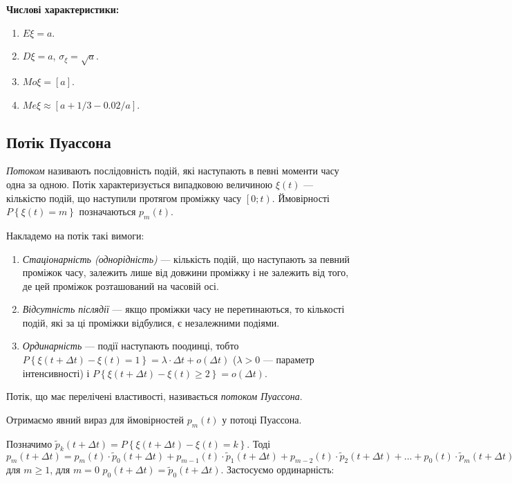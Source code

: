 \noindent\textbf{Числові характеристики:}
\begin{enumerate}
    \item $E\xi = a$.
    \item $D\xi = a$, $\sigma_\xi = \sqrt{a}$.
    \item ${Mo}\xi = \left[a\right]$.
    \item ${Me}\xi \approx \left[a + 1/3 - 0.02/a\right]$.
\end{enumerate}

\subsection{Потік Пуассона}
\emph{Потоком} називають послідовність подій, які наступають в певні моменти часу одна за одною.
Потік характеризується випадковою величиною $\xi(t)$ --- 
кількістю подій, що наступили протягом проміжку часу $\left[ 0; t\right)$.
Ймовірності $P\left\{\xi(t) = m\right\}$ позначаються $p_m(t)$.

Накладемо на потік такі вимоги:
\begin{enumerate}
    \item \emph{Стаціонарність (однорідність)} --- кількість подій, що наступають
    за певний проміжок часу, залежить лише від довжини проміжку і не залежить
    від того, де цей проміжок розташований на часовій осі.
    \item \emph{Відсутність післядії} --- якщо проміжки часу не перетинаються, то кількості подій,
    які за ці проміжки відбулися, є незалежними подіями.
    \item \emph{Ординарність} --- події наступають поодинці, тобто
    $P\left\{\xi(t+\Delta t) - \xi(t) = 1\right\} = \lambda\cdot\Delta t + o(\Delta t)$
    ($\lambda > 0$ --- параметр інтенсивності) і 
    $P\left\{\xi(t+\Delta t) - \xi(t) \geq 2\right\} = o(\Delta t)$.
\end{enumerate}
\begin{definition}
    Потік, що має перелічені властивості, називається \emph{потоком Пуассона}.
\end{definition}
Отримаємо явний вираз для ймовірностей $p_m(t)$ у потоці Пуассона.

Позначимо $\tilde{p}_k(t+\Delta t) = P\left\{\xi(t+\Delta t) - \xi(t) = k\right\}$.
Тоді $p_m(t+\Delta t) = p_m(t)\cdot \tilde{p}_0(t+\Delta t) + p_{m-1}(t)\cdot \tilde{p}_1(t+\Delta t) +
p_{m-2}(t)\cdot \tilde{p}_2(t+\Delta t) + ... + p_0(t)\cdot \tilde{p}_m(t+\Delta t)$ для $m \geq 1$,
для $m=0$ $p_0(t+\Delta t) = \tilde{p}_0(t+\Delta t)$. Застосуємо ординарність:

